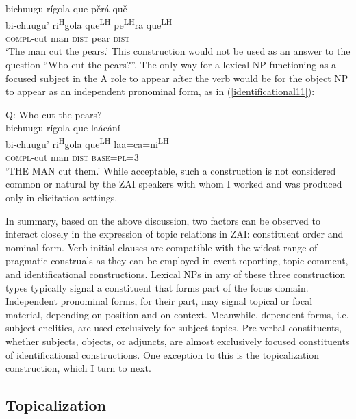 \ea\label{identificational10} 
\glll bichuugu r\'{i}gola que p\v{e}r\'{a} qu\v{e}  \\
bi-chuugu' ri\textsuperscript{H}gola que\textsuperscript{LH} pe\textsuperscript{LH}ra que\textsuperscript{LH}  \\
\textsc{compl}-cut man \textsc{dist} pear \textsc{dist}  \\
\glt `The man cut the pears.'
\z
This construction would not be used as an answer to the question ``Who cut the pears?''. The only way for a lexical NP functioning as a focused subject in the A role to appear after the verb would be for the object NP to appear as an independent pronominal form, as in (\ref{identificational11}):

\ea\label{identificational11}  
{Q: Who cut the pears?} \\
\glll bichuugu r\'{i}gola que la\'{a}c\'{a}n\v{i}  \\
bi-chuugu' ri\textsuperscript{H}gola que\textsuperscript{LH} laa=ca=ni\textsuperscript{LH}  \\
\textsc{compl}-cut man \textsc{dist} \textsc{base}=\textsc{pl}=\textsc{3}  \\
\glt `THE MAN cut them.'
\z
While acceptable, such a construction is not considered common or natural by the ZAI speakers with whom I worked and was produced only in elicitation settings.

In summary, based on the above discussion, two factors can be observed to interact closely in the expression of topic relations in ZAI: constituent order and nominal form. Verb-initial clauses are compatible with the widest range of pragmatic construals as they can be employed in event-reporting, topic-comment, and identificational constructions. Lexical NPs in any of these three construction types typically signal a constituent that forms part of the focus domain. Independent pronominal forms, for their part, may signal topical or focal material, depending on position and on context. Meanwhile, dependent forms, i.e. subject enclitics, are used exclusively for subject-topics. Pre-verbal constituents, whether subjects, objects, or adjuncts, are almost exclusively focused constituents of identificational constructions. One exception to this is the topicalization construction, which I turn to next.


\subsection{Topicalization}\label{topicalizationsection}

